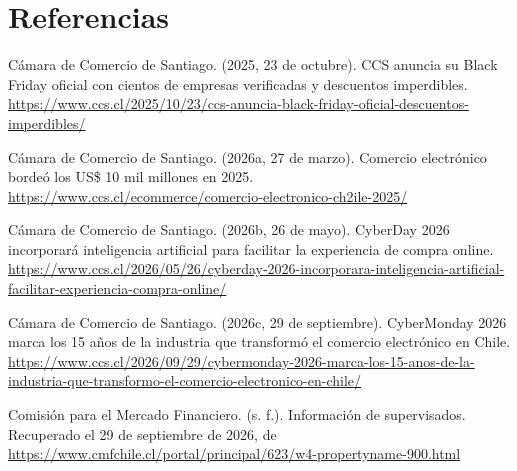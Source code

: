 \documentclass[11pt]{article}
\begin{document}
\section*{Referencias}

Cámara de Comercio de Santiago. (2025, 23 de octubre). CCS anuncia su Black Friday oficial con cientos de empresas verificadas y descuentos imperdibles. \href{https://www.google.com/url?q=https://www.ccs.cl/2025/10/23/ccs-anuncia-black-friday-oficial-descuentos-imperdibles/&sa=D&source=editors&ust=1791319645253091&usg=AOvVaw30lrO3x2kJr25_tfXrILdg}{https://www.ccs.cl/2025/10/23/ccs-anuncia-black-friday-oficial-descuentos-imperdibles/}

Cámara de Comercio de Santiago. (2026a, 27 de marzo). Comercio electrónico bordeó los US\$ 10 mil millones en 2025. \href{https://www.google.com/url?q=https://www.ccs.cl/ecommerce/comercio-electronico-chile-2025/&sa=D&source=editors&ust=1791319645253399&usg=AOvVaw32O2VfAKg19iUKjr39vyDp}{https://www.ccs.cl/ecommerce/comercio-electronico-ch2ile-2025/}

Cámara de Comercio de Santiago. (2026b, 26 de mayo). CyberDay 2026 incorporará inteligencia artificial para facilitar la experiencia de compra online. \href{https://www.google.com/url?q=https://www.ccs.cl/2026/05/26/cyberday-2026-incorporara-inteligencia-artificial-facilitar-experiencia-compra-online/&sa=D&source=editors&ust=1791319645253794&usg=AOvVaw3U0S7PiQRKbGig5ylgm_TQ}{https://www.ccs.cl/2026/05/26/cyberday-2026-incorporara-inteligencia-artificial-facilitar-experiencia-compra-online/}

Cámara de Comercio de Santiago. (2026c, 29 de septiembre). CyberMonday 2026 marca los 15 años de la industria que transformó el comercio electrónico en Chile. \href{https://www.google.com/url?q=https://www.ccs.cl/2026/09/29/cybermonday-2026-marca-los-15-anos-de-la-industria-que-transformo-el-comercio-electronico-en-chile/&sa=D&source=editors&ust=1791319645254181&usg=AOvVaw0MNK6mdSbwjWfRotpK4q_F}{https://www.ccs.cl/2026/09/29/cybermonday-2026-marca-los-15-anos-de-la-industria-que-transformo-el-comercio-electronico-en-chile/}

Comisión para el Mercado Financiero. (s. f.). Información de supervisados. Recuperado el 29 de septiembre de 2026, de \href{https://www.google.com/url?q=https://www.cmfchile.cl/portal/principal/623/w4-propertyname-900.html&sa=D&source=editors&ust=1791319645254465&usg=AOvVaw1oOBc5ve_tfj1mEOh2p9a3}{https://www.cmfchile.cl/portal/principal/623/w4-propertyname-900.html}
\end{document}
